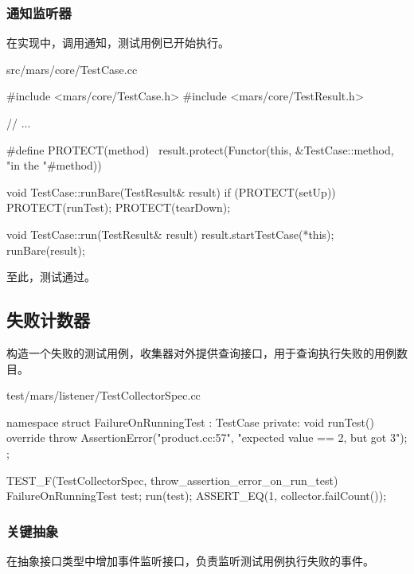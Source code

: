 \begin{content}
\subsubsection{通知监听器}

在实现中，调用通知，测试用例已开始执行。

\begin{nodiff}{src/mars/core/TestCase.cc}
 \begin{c++}
#include <mars/core/TestCase.h>
#include <mars/core/TestResult.h>

// ...

#define PROTECT(method) \
  result.protect(Functor(this, &TestCase::method,  "in the "#method))

void TestCase::runBare(TestResult& result) {
  if (PROTECT(setUp)) {
    PROTECT(runTest);
  }
  PROTECT(tearDown);
}

void TestCase::run(TestResult& result) {
  result.startTestCase(*this);
  runBare(result);
}
 \end{c++}
\end{nodiff}

至此，测试通过。

\subsection{失败计数器}

构造一个失败的测试用例，收集器对外提供查询接口，用于查询执行失败的用例数目。

\begin{nodiff}{test/mars/listener/TestCollectorSpec.cc}
 \begin{c++}
namespace {
  struct FailureOnRunningTest : TestCase {
  private:
    void runTest() override {
      throw AssertionError("product.cc:57", "expected value == 2, but got 3");
    }
  };
}

TEST_F(TestCollectorSpec, throw_assertion_error_on_run_test) {
  FailureOnRunningTest test;
  run(test);
  ASSERT_EQ(1, collector.failCount());
}
 \end{c++}
\end{nodiff}

\subsubsection{关键抽象}

在抽象接口类型中增加事件监听接口，负责监听测试用例执行失败的事件。


\end{content}
